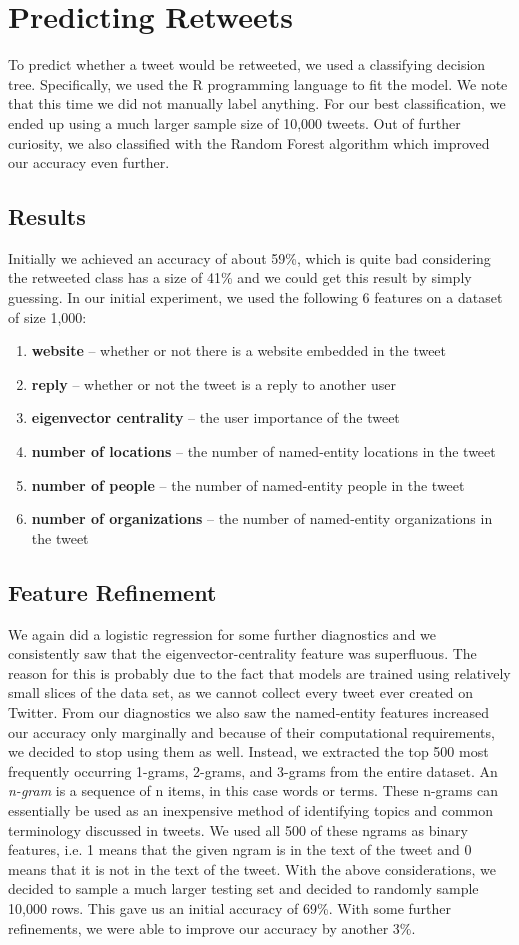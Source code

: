 \documentclass[12pt]{article}
\begin{document}
\section{Predicting Retweets}
To predict whether a tweet would be retweeted, we used a classifying decision tree. Specifically, we used the R programming language to fit the model. We note that this time we did not manually label anything. For our best classification, we ended up using a much larger sample size of 10,000 tweets. Out of further curiosity, we also classified with the Random Forest algorithm which improved our accuracy even further.
\subsection{Results}
Initially we achieved an accuracy of about 59\%, which is quite bad considering the retweeted class has a size of 41\% and we could get this result by simply guessing. In our initial experiment, we used the following 6 features on a dataset of size 1,000:
\begin{enumerate}
	\item \textbf{website}                  -- whether or not there is a website embedded in the tweet
	\item \textbf{reply}                    -- whether or not the tweet is a reply to another user
	\item \textbf{eigenvector centrality}   -- the user importance of the tweet 
	\item \textbf{number of locations}      -- the number of named-entity locations in the tweet
	\item \textbf{number of people}         -- the number of named-entity people in the tweet
	\item \textbf{number of organizations}  -- the number of named-entity organizations in the tweet
\end{enumerate}
\subsection{Feature Refinement}
We again did a logistic regression for some further diagnostics and we consistently saw that the eigenvector-centrality feature was superfluous. The reason for this is probably due to the fact that models are trained using relatively small slices of the data set, as we cannot collect every tweet ever created on Twitter. From our diagnostics we also saw the named-entity features increased our accuracy only marginally and because of their computational requirements, we decided to stop using them as well. Instead, we extracted the top 500 most frequently occurring 1-grams, 2-grams, and 3-grams from the entire dataset. An {\it n-gram} is a sequence of n items, in this case words or terms. These n-grams can essentially be used as an inexpensive method of identifying topics and common terminology discussed in tweets. We used all 500 of these ngrams as binary features, i.e. 1 means that the given ngram is in the text of the tweet and 0 means that it is not in the text of the tweet. With the above considerations, we decided to sample a much larger testing set and decided to randomly sample 10,000 rows. This gave us an initial accuracy of 69\%. With some further refinements, we were able to improve our accuracy by another 3\%.
\newpage
\end{document}
